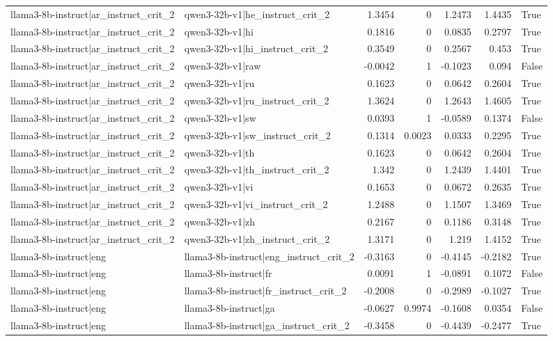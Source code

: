\begin{table}
\begin{tabular}{l l r r r r l}
llama3-8b-instruct|ar_instruct_crit_2 & qwen3-32b-v1|he_instruct_crit_2 & 1.3454 & 0 & 1.2473 & 1.4435 & True \\
llama3-8b-instruct|ar_instruct_crit_2 & qwen3-32b-v1|hi & 0.1816 & 0 & 0.0835 & 0.2797 & True \\
llama3-8b-instruct|ar_instruct_crit_2 & qwen3-32b-v1|hi_instruct_crit_2 & 0.3549 & 0 & 0.2567 & 0.453 & True \\
llama3-8b-instruct|ar_instruct_crit_2 & qwen3-32b-v1|raw & -0.0042 & 1 & -0.1023 & 0.094 & False \\
llama3-8b-instruct|ar_instruct_crit_2 & qwen3-32b-v1|ru & 0.1623 & 0 & 0.0642 & 0.2604 & True \\
llama3-8b-instruct|ar_instruct_crit_2 & qwen3-32b-v1|ru_instruct_crit_2 & 1.3624 & 0 & 1.2643 & 1.4605 & True \\
llama3-8b-instruct|ar_instruct_crit_2 & qwen3-32b-v1|sw & 0.0393 & 1 & -0.0589 & 0.1374 & False \\
llama3-8b-instruct|ar_instruct_crit_2 & qwen3-32b-v1|sw_instruct_crit_2 & 0.1314 & 0.0023 & 0.0333 & 0.2295 & True \\
llama3-8b-instruct|ar_instruct_crit_2 & qwen3-32b-v1|th & 0.1623 & 0 & 0.0642 & 0.2604 & True \\
llama3-8b-instruct|ar_instruct_crit_2 & qwen3-32b-v1|th_instruct_crit_2 & 1.342 & 0 & 1.2439 & 1.4401 & True \\
llama3-8b-instruct|ar_instruct_crit_2 & qwen3-32b-v1|vi & 0.1653 & 0 & 0.0672 & 0.2635 & True \\
llama3-8b-instruct|ar_instruct_crit_2 & qwen3-32b-v1|vi_instruct_crit_2 & 1.2488 & 0 & 1.1507 & 1.3469 & True \\
llama3-8b-instruct|ar_instruct_crit_2 & qwen3-32b-v1|zh & 0.2167 & 0 & 0.1186 & 0.3148 & True \\
llama3-8b-instruct|ar_instruct_crit_2 & qwen3-32b-v1|zh_instruct_crit_2 & 1.3171 & 0 & 1.219 & 1.4152 & True \\
llama3-8b-instruct|eng & llama3-8b-instruct|eng_instruct_crit_2 & -0.3163 & 0 & -0.4145 & -0.2182 & True \\
llama3-8b-instruct|eng & llama3-8b-instruct|fr & 0.0091 & 1 & -0.0891 & 0.1072 & False \\
llama3-8b-instruct|eng & llama3-8b-instruct|fr_instruct_crit_2 & -0.2008 & 0 & -0.2989 & -0.1027 & True \\
llama3-8b-instruct|eng & llama3-8b-instruct|ga & -0.0627 & 0.9974 & -0.1608 & 0.0354 & False \\
llama3-8b-instruct|eng & llama3-8b-instruct|ga_instruct_crit_2 & -0.3458 & 0 & -0.4439 & -0.2477 & True \\

\end{tabular}
\end{table}
